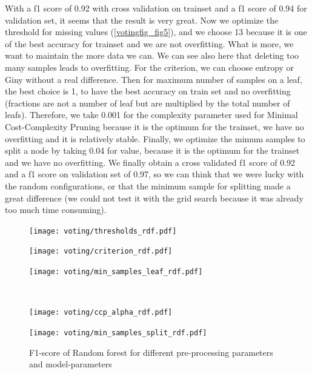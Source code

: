\documentclass[11pt]{article}
\begin{document}
With a f1 score of 0.92 with cross validation on trainset and a f1 score of 0.94 for validation set, it seems that the result is very great.  Now we optimize the threshold for missing values (\ref{votingfig_fig5}), and we choose 13 because it is one of the best accuracy for trainset and we are not overfitting. What is more, we want to maintain the more data we can. We can see also here that deleting too many samples leads to overfitting. For the criterion, we can choose entropy or Giny without a real difference. Then for maximum number of samples on a leaf, the best choice is 1, to have the best accuracy on train set and no overfitting (fractions are not a number of leaf but are multiplied by the total number of leafs). Therefore, we take 0.001 for the complexity parameter used for Minimal Cost-Complexity Pruning because it is the optimum for the trainset, we have no overfitting and it is relatively stable. Finally, we optimize the mimum samples to split a node by taking 0.04 for value, because it is the optimum for the trainset and we have no overfitting.
We finally obtain a cross validated f1 score of 0.92 and a f1 score on validation set of 0.97, so we can think that we were lucky with the random configurations, or that the minimum sample for splitting made a great difference (we could not test it with the grid search because it was already too much time consuming).

\begin{figure}
\begin{minipage}[l]{0.3\textwidth}
\texttt{[image: voting/thresholds\_rdf.pdf]}
\end{minipage}
\begin{minipage}[l]{0.3\textwidth}
\texttt{[image: voting/criterion\_rdf.pdf]}
\end{minipage}
\begin{minipage}[l]{0.3\textwidth}
\texttt{[image: voting/min\_samples\_leaf\_rdf.pdf]}
\end{minipage}\\
\begin{minipage}[t]{0.3\textwidth}
\texttt{[image: voting/ccp\_alpha\_rdf.pdf]}
\end{minipage}
\begin{minipage}[t]{0.3\textwidth}
\texttt{[image: voting/min\_samples\_split\_rdf.pdf]}
\end{minipage}
\begin{minipage}[t]{0.3\textwidth}
\end{minipage}
   \caption{F1-score of Random forest for different pre-processing parameters and model-parameters}
\label{votingfig_fig4}
\end{figure}
\end{document}
